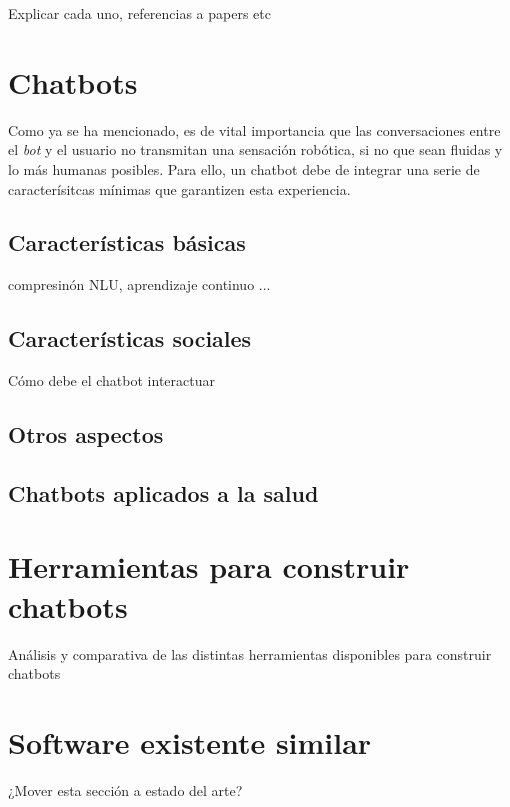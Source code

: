 Explicar cada uno, referencias a papers etc


\section{Chatbots}
Como ya se ha mencionado, es de vital importancia que las conversaciones entre el \textit{bot} y el usuario no transmitan una sensación robótica, si no que sean fluidas y lo más humanas posibles. Para ello, un chatbot debe de integrar una serie de caracterísitcas mínimas que garantizen esta experiencia.


\subsection{Características básicas}
compresinón NLU, aprendizaje continuo ...

\subsection{Características sociales} 
Cómo debe el chatbot interactuar

\subsection{Otros aspectos} 


\subsection{Chatbots aplicados a la salud} 

\section{Herramientas para construir chatbots}
Análisis y comparativa de las distintas herramientas disponibles para construir chatbots

\section{Software existente similar}
¿Mover esta sección a estado del arte? 
